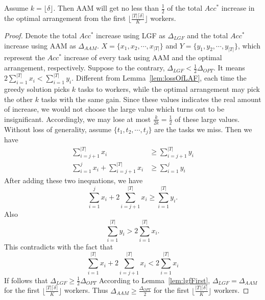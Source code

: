 \begin{lemma}	
\label{lem:lossOfAAM}
Assume $k = \lfloor \delta \rfloor$.
Then AAM will get no less than $\frac{1}{2}$ of the total $Acc^{*}$ increase in the optimal arrangement from the first $\lfloor \frac{|T|\lceil \delta \rceil}{K}\rfloor$ workers.
\end{lemma}
\begin{proof}
Denote the total $Acc^{*}$ increase using LGF as $\Delta_{LGF}$ and the total $Acc^{*}$ increase using AAM as $\Delta_{AAM}$.
$X = \{x_1, x_2, \cdots, x_{|T|}\}$ and $Y = \{y_1, y_2, \cdots, y_{|T|}\}$, which represent the $Acc^{*}$ increase of every task using AAM and the optimal arrangement, respectively.
Suppose to the contrary, $\Delta_{LGF} < \frac{1}{2} \Delta_{OPT}$.
It means $2\sum_{i=1}^{|T|} {x_i} < \sum_{i=1}^{|T|} {y_i}$.
Different from Lemma~\ref{lem:lossOfLAF}, each time the greedy solution  picks $k$ tasks to workers, while the optimal arrangement may pick the other $k$ tasks with the same gain.
Since these values indicates the real amount of increase, we would not choose the large value which turns out to be insignificant.
Accordingly, we may lose at most $\frac{k}{2k}=\frac{1}{2}$ of these large values.
Without loss of generality, assume $\{t_1, t_2, \cdots, t_j\}$ are the tasks we miss.
Then we have
\begin{align*}
	\sum_{i=j+1}^{|T|}{x_i} &\ge \sum_{i=j+1}^{|T|}{y_i} \\
	\sum_{i=1}^{j}{x_i} + \sum_{i=j+1}^{|T|}{x_i} &\ge \sum_{i=1}^{j}{y_i}
\end{align*}
After adding these two inequations, we have
\[
	\sum_{i=1}^{j}{x_i} + 2\sum_{i=j+1}^{|T|}{x_i} \ge \sum_{i=1}^{|T|}{y_i}.
\]
Also
\[
	\sum_{i=1}^{|T|} {y_i} > 2\sum_{i=1}^{|T|} {x_i}.
\]
This contradicts with the fact that
\[
	\sum_{i=1}^{|T|}{x_i} + 2\sum_{i=j+1}^{|T|}{x_i} < 2\sum_{i=1}^{|T|} {x_i}
\]
If follows that $\Delta_{LGF} \ge \frac{1}{2} \Delta_{OPT}$
According to Lemma~\ref{lem:lgfFirst}, $\Delta_{LGF} = \Delta_{AAM}$ for the first $\lfloor \frac{|T|\lceil \delta \rceil}{K}\rfloor$ workers.
Thus $\Delta_{AAM} \ge \frac{\Delta_{OPT}}{2}$ for the first $\lfloor \frac{|T|\lceil \delta \rceil}{K}\rfloor$ workers.
\end{proof}
	
